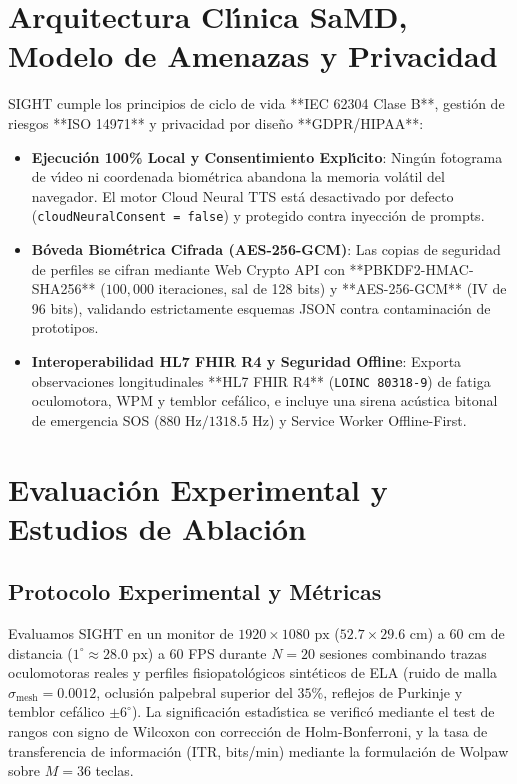 \documentclass[twocolumn,10pt]{article}
\begin{document}
\section{Arquitectura Cl\'{\i}nica SaMD, Modelo de Amenazas y Privacidad}
\label{sec:samd}
SIGHT cumple los principios de ciclo de vida **IEC 62304 Clase B**, gesti\'on de riesgos **ISO 14971** y privacidad por dise\~no **GDPR/HIPAA**:
\begin{itemize}
    \item \textbf{Ejecuci\'on 100\% Local y Consentimiento Expl\'{\i}cito}: Ning\'un fotograma de v\'{\i}deo ni coordenada biom\'etrica abandona la memoria vol\'atil del navegador. El motor Cloud Neural TTS est\'a desactivado por defecto (\texttt{cloudNeuralConsent = false}) y protegido contra inyecci\'on de prompts.
    \item \textbf{B\'oveda Biom\'etrica Cifrada (AES-256-GCM)}: Las copias de seguridad de perfiles se cifran mediante Web Crypto API con **PBKDF2-HMAC-SHA256** ($100,000$ iteraciones, sal de 128 bits) y **AES-256-GCM** (IV de 96 bits), validando estrictamente esquemas JSON contra contaminaci\'on de prototipos.
    \item \textbf{Interoperabilidad HL7 FHIR R4 y Seguridad Offline}: Exporta observaciones longitudinales **HL7 FHIR R4** (\texttt{LOINC 80318-9}) de fatiga oculomotora, WPM y temblor cef\'alico, e incluye una sirena ac\'ustica bitonal de emergencia SOS ($880\text{ Hz} / 1318.5\text{ Hz}$) y Service Worker Offline-First.
\end{itemize}

\section{Evaluaci\'on Experimental y Estudios de Ablaci\'on}
\label{sec:experiments}

\subsection{Protocolo Experimental y M\'etricas}
Evaluamos SIGHT en un monitor de $1920 \times 1080\text{ px}$ ($52.7 \times 29.6\text{ cm}$) a $60\text{ cm}$ de distancia ($1^\circ \approx 28.0\text{ px}$) a 60 FPS durante $N = 20$ sesiones combinando trazas oculomotoras reales y perfiles fisiopatol\'ogicos sint\'eticos de ELA (ruido de malla $\sigma_{\text{mesh}} = 0.0012$, oclusi\'on palpebral superior del $35\%$, reflejos de Purkinje y temblor cef\'alico $\pm 6^\circ$). La significaci\'on estad\'{\i}stica se verific\'o mediante el test de rangos con signo de Wilcoxon con correcci\'on de Holm-Bonferroni, y la tasa de transferencia de informaci\'on (ITR, bits/min) mediante la formulaci\'on de Wolpaw sobre $M=36$ teclas.
\end{document}
